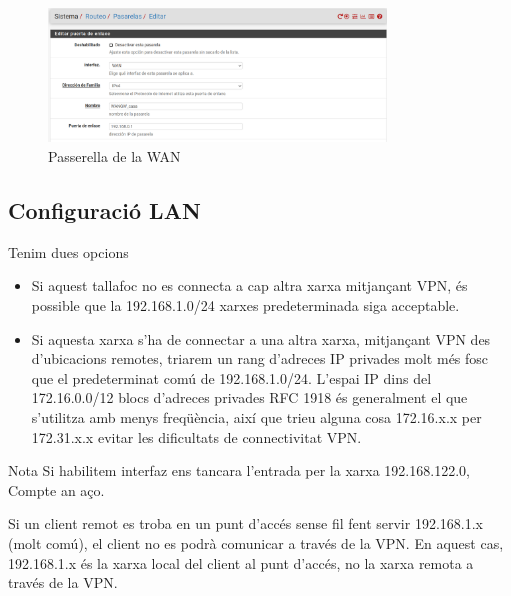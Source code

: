 \documentclass[
  10pt,
]{krantz}
\providecommand{\tightlist}{%
  \setlength{\itemsep}{0pt}\setlength{\parskip}{0pt}}
\begin{document}
\begin{figure}
\centering
\includegraphics[width=0.8\textwidth,height=\textheight]{imatges/passarella_de_WAN.png}
\caption{Passerella de la WAN}
\end{figure}

\hypertarget{configuraciuxf3-lan}{%
\subsection{Configuració LAN}\label{configuraciuxf3-lan}}

Tenim dues opcions

\begin{itemize}
\tightlist
\item
  Si aquest tallafoc no es connecta a cap altra xarxa mitjançant VPN, és possible que la 192.168.1.0/24 xarxes predeterminada siga acceptable.
\item
  Si aquesta xarxa s'ha de connectar a una altra xarxa, mitjançant VPN des d'ubicacions remotes, triarem un rang d'adreces IP privades molt més fosc que el predeterminat comú de 192.168.1.0/24. L'espai IP dins del 172.16.0.0/12 blocs d'adreces privades RFC 1918 és generalment el que s'utilitza amb menys freqüència, així que trieu alguna cosa 172.16.x.x per 172.31.x.x evitar les dificultats de connectivitat VPN.
\end{itemize}

\begin{rmdwarn}{Nota}
Si habilitem interfaz ens tancara l'entrada per la xarxa 192.168.122.0, Compte an aço.

Si un client remot es troba en un punt d'accés sense fil fent servir 192.168.1.x (molt comú), el client no es podrà comunicar a través de la VPN. En aquest cas, 192.168.1.x és la xarxa local del client al punt d'accés, no la xarxa remota a través de la VPN.

\end{rmdwarn}
\end{document}
